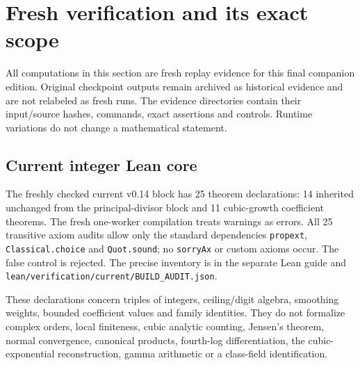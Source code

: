 \section{Fresh verification and its exact scope}\label{sec:verification}
All computations in this section are fresh replay evidence for this final companion edition. Original checkpoint outputs remain archived as historical evidence and are not relabeled as fresh runs. The evidence directories contain their input/source hashes, commands, exact assertions and controls. Runtime variations do not change a mathematical statement.

\subsection{Current integer Lean core}
The freshly checked current v0.14 block has 25 theorem declarations: 14 inherited unchanged from the principal-divisor block and 11 cubic-growth coefficient theorems. The fresh one-worker compilation treats warnings as errors. All 25 transitive axiom audits allow only the standard dependencies \texttt{propext}, \texttt{Classical.choice} and \texttt{Quot.sound}; no \texttt{sorryAx} or custom axioms occur. The false control is rejected. The precise inventory is in the separate Lean guide and \texttt{lean/verification/current/BUILD\_AUDIT.json}.

These declarations concern triples of integers, ceiling/digit algebra, smoothing weights, bounded coefficient values and family identities. They do not formalize complex orders, local finiteness, cubic analytic counting, Jensen's theorem, normal convergence, canonical products, fourth-log differentiation, the cubic-exponential reconstruction, gamma arithmetic or a class-field identification.

